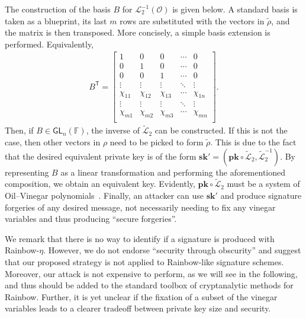\documentclass[draft, 12pt, a4paper, oneside]{memoir}
\theoremstyle{definition}
\begin{document}
The construction of the basis $B$ for $\mathcal{L}_{2}^{-1}(\mathcal{O})$ is given below. A standard basis is taken as a blueprint, its last $m$ rows are substituted with the vectors in $\widetilde{\rho}$, and the matrix is then transposed. More concisely, a simple basis extension is performed. Equivalently,
\begin{align*}
  B^{\mathsf{T}} = \begin{bmatrix}
    1 & 0 & 0 & \cdots & 0 \\
    0 & 1 & 0 & \cdots & 0 \\
    0 & 0 & 1 & \cdots & 0 \\
    \vdots & \vdots & \vdots & \ddots & \vdots \\
    \chi_{11} & \chi_{12} & \chi_{13} & \cdots & \chi_{1n} \\
        \vdots & \vdots & \vdots & \ddots & \vdots \\
    \chi_{m1} & \chi_{m2} & \chi_{m3} & \cdots & \chi_{mn} \\
  \end{bmatrix}.
\end{align*}
Then, if $B \in \mathsf{GL}_{n}(\mathbb{F})$, the inverse of $\widetilde{\mathcal{L}}_{2}$ can be constructed. If this is not the case, then other vectors in $\rho$ need to be picked to form $\widetilde{\rho}$. This is due to the fact that the desired equivalent private key is of the form $\mathbf{sk'} = (\mathbf{pk} \circ \widetilde{\mathcal{L}}_{2}, \widetilde{\mathcal{L}}_{2}^{-1})$. By representing $B$ as a linear transformation and performing the aforementioned composition, we obtain an equivalent key. Evidently, $\mathbf{pk} \circ \widetilde{\mathcal{L}}_{2}$ must be a system of Oil--Vinegar polynomials~\cite[Theorem 1]{Beullens:201706}. Finally, an attacker can use $\mathbf{sk'}$ and produce signature forgeries of any desired message, not necessarily needing to fix any vinegar variables and thus producing ``secure forgeries''.

We remark that there is no way to identify if a signature is produced with Rainbow-$\eta$. However, we do not endorse ``security through obscurity'' and suggest that our proposed strategy is not applied to Rainbow-like signature schemes. Moreover, our attack is not expensive to perform, as we will see in the following, and thus should be added to the standard toolbox of cryptanalytic methods for Rainbow. Further, it is yet unclear if the fixation of a subset of the vinegar variables leads to a clearer tradeoff between private key size and security.





\end{document}

